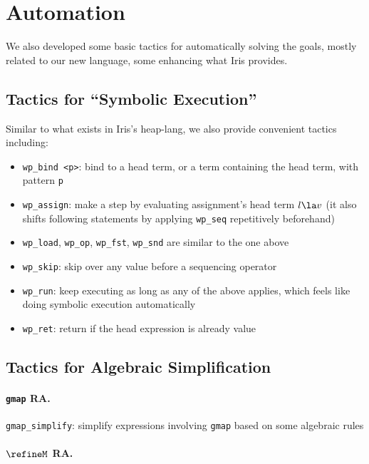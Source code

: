 \section{Automation}
\label{sec:auto}

We also developed some basic tactics for automatically solving the goals,
mostly related to our new language, some enhancing what Iris provides.

\subsection{Tactics for ``Symbolic Execution''}

Similar to what exists in Iris's heap-lang, we also provide convenient tactics
including:

\begin{itemize}
    \item \texttt{wp\_bind <p>}: bind to a head term, or a term containing the head term, with pattern \texttt{p}
    \item \texttt{wp\_assign}: make a step by evaluating assignment's head term $l \la v$
        (it also shifts following statements by applying \texttt{wp\_seq} repetitively beforehand)
    \item \texttt{wp\_load}, \texttt{wp\_op}, \texttt{wp\_fst}, \texttt{wp\_snd} are similar to the one above
    \item \texttt{wp\_skip}: skip over any value before a sequencing operator
    \item \texttt{wp\_run}: keep executing as long as any of the above applies, which feels like doing
      symbolic execution automatically
    \item \texttt{wp\_ret}: return if the head expression is already value
\end{itemize}

\subsection{Tactics for Algebraic Simplification}

\paragraph{\texttt{gmap} RA.}

\texttt{gmap\_simplify}: simplify expressions involving \texttt{gmap} based on some algebraic rules

\paragraph{$\refineM$ RA.}

